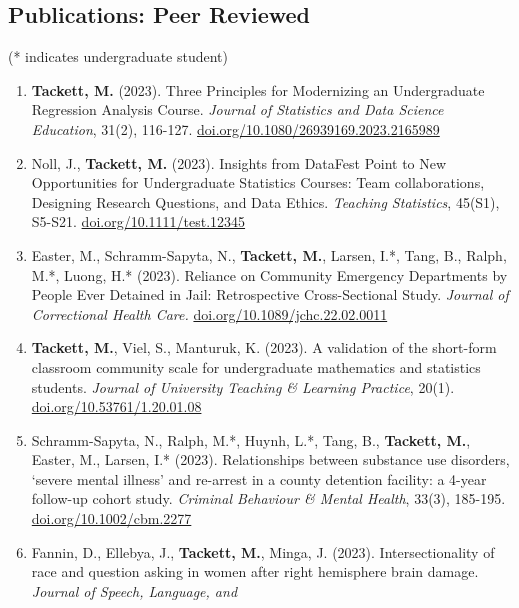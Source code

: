\documentclass[11pt,dvipsnames]{article}
\begin{document}
\hypertarget{publications-peer-reviewed}{%
\subsection{Publications: Peer
Reviewed}\label{publications-peer-reviewed}}

(* indicates undergraduate student)

\begin{enumerate}
\def\labelenumi{\arabic{enumi}.}
\item
  \textbf{Tackett, M.} (2023). Three Principles for Modernizing an
  Undergraduate Regression Analysis Course. \emph{Journal of Statistics
  and Data Science Education}, 31(2), 116-127.
  \href{https://doi.org/10.1080/26939169.2023.2165989}{doi.org/10.1080/26939169.2023.2165989}
\item
  Noll, J., \textbf{Tackett, M.} (2023). Insights from DataFest Point to
  New Opportunities for Undergraduate Statistics Courses: Team
  collaborations, Designing Research Questions, and Data Ethics.
  \emph{Teaching Statistics}, 45(S1), S5-S21.
  \href{https://doi.org/10.1111/test.12345}{doi.org/10.1111/test.12345}
\item
  Easter, M., Schramm-Sapyta, N., \textbf{Tackett, M.}, Larsen, I.*,
  Tang, B., Ralph, M.*, Luong, H.* (2023). Reliance on Community
  Emergency Departments by People Ever Detained in Jail: Retrospective
  Cross-Sectional Study. \emph{Journal of Correctional Health Care.}
  \href{https://doi.org/10.1089/jchc.22.02.0011}{doi.org/10.1089/jchc.22.02.0011}
\item
  \textbf{Tackett, M.}, Viel, S., Manturuk, K. (2023). A validation of
  the short-form classroom community scale for undergraduate mathematics
  and statistics students. \emph{Journal of University Teaching \&
  Learning Practice}, 20(1).
  \href{https://doi.org/10.53761/1.20.01.08}{doi.org/10.53761/1.20.01.08}
\item
  Schramm-Sapyta, N., Ralph, M.*, Huynh, L.*, Tang, B., \textbf{Tackett,
  M.}, Easter, M., Larsen, I.* (2023). Relationships between substance
  use disorders, `severe mental illness' and re-arrest in a county
  detention facility: a 4-year follow-up cohort study. \emph{Criminal
  Behaviour \& Mental Health}, 33(3), 185-195.
  \href{https://doi.org/10.1002/cbm.2277}{doi.org/10.1002/cbm.2277}
\item
  Fannin, D., Ellebya, J., \textbf{Tackett, M.}, Minga, J. (2023).
  Intersectionality of race and question asking in women after right
  hemisphere brain damage. \emph{Journal of Speech, Language, and
}
\end{enumerate}
\end{document}
